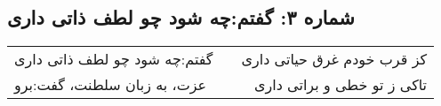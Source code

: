 \begin{center}
\section*{شماره ۳: گفتم:‌چه شود چو لطف ذاتی داری}
\label{sec:003}
\begin{longtable}{l p{0.5cm} r}
گفتم:‌چه شود چو لطف ذاتی داری
&&
کز قرب خودم غرق حیاتی داری
\\
عزت، به زبان سلطنت، گفت:‌برو
&&
تاکی ز تو خطی و براتی داری
\\
\end{longtable}
\end{center}
